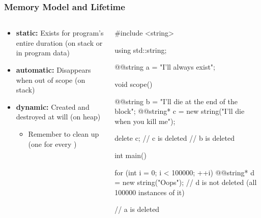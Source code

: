 \documentclass[glossy]{beamer}
\begin{document}
\begin{frame}[fragile=singleslide]
  \frametitle{Memory Model and Lifetime}
  \begin{columns}
    \begin{column}{6cm}
      \begin{itemize}
        \item \textbf{static:} Exists for program's entire duration (on stack or in program data)
        \item \textbf{automatic:} Disappears when out of scope (on stack)
        \item \textbf{dynamic:} Created and destroyed at will (on heap)
        \begin{itemize}
          \item Remember to clean up (one  for every )
        \end{itemize}
      \end{itemize}
    \end{column}

    \begin{column}{6cm}
      \begin{cppcode}
#include <string>

using std::string;

@@string a = "I'll always exist";

void scope() {
  @@string b = "I'll die at the end of the block";
  @@string* c = new string("I'll die when you kill me");

  delete c; // c is deleted
  // b is deleted
}

int main() {
  for (int i = 0; i < 100000; ++i) {
    @@string* d = new string("Oops");
    // d is not deleted (all 100000 instances of it)
  }

  // a is deleted
}
      \end{cppcode}
    \end{column}
  \end{columns}

\end{frame}
\end{document}
